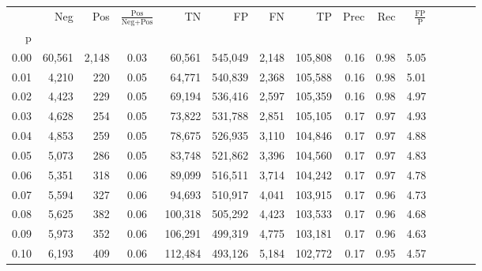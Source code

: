 \begin{tabular}{rrrcrrrrrrrrrrr}
\toprule
{} &     Neg &     Pos & $\frac{\text{Pos}}{\text{Neg}+\text{Pos}}$ &       TN &       FP &       FN &       TP &  Prec &   Rec & $\frac{\text{FP}}{\text{P}}$ \\
p    &         &         &                                            &          &          &          &          &       &       &                              \\
\midrule
0.00 &  60,561 &   2,148 &                                       0.03 &   60,561 &  545,049 &    2,148 &  105,808 &  0.16 &  0.98 &                         5.05 \\
0.01 &   4,210 &     220 &                                       0.05 &   64,771 &  540,839 &    2,368 &  105,588 &  0.16 &  0.98 &                         5.01 \\
0.02 &   4,423 &     229 &                                       0.05 &   69,194 &  536,416 &    2,597 &  105,359 &  0.16 &  0.98 &                         4.97 \\
0.03 &   4,628 &     254 &                                       0.05 &   73,822 &  531,788 &    2,851 &  105,105 &  0.17 &  0.97 &                         4.93 \\
0.04 &   4,853 &     259 &                                       0.05 &   78,675 &  526,935 &    3,110 &  104,846 &  0.17 &  0.97 &                         4.88 \\
0.05 &   5,073 &     286 &                                       0.05 &   83,748 &  521,862 &    3,396 &  104,560 &  0.17 &  0.97 &                         4.83 \\
0.06 &   5,351 &     318 &                                       0.06 &   89,099 &  516,511 &    3,714 &  104,242 &  0.17 &  0.97 &                         4.78 \\
0.07 &   5,594 &     327 &                                       0.06 &   94,693 &  510,917 &    4,041 &  103,915 &  0.17 &  0.96 &                         4.73 \\
0.08 &   5,625 &     382 &                                       0.06 &  100,318 &  505,292 &    4,423 &  103,533 &  0.17 &  0.96 &                         4.68 \\
0.09 &   5,973 &     352 &                                       0.06 &  106,291 &  499,319 &    4,775 &  103,181 &  0.17 &  0.96 &                         4.63 \\
0.10 &   6,193 &     409 &                                       0.06 &  112,484 &  493,126 &    5,184 &  102,772 &  0.17 &  0.95 &                         4.57 \\

\end{tabular}
